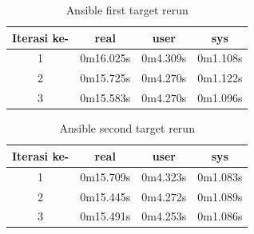 \documentclass[10pt,]{report}
\begin{document}
\begin{adjustwidth}{20pt}{}
	\begin{table}[H]
		\caption{Ansible first target rerun}
		\begin{center}
			\begin{tabular}[c]{|c|c|c|c|}
				\hline
				\multicolumn{1}{|c|}{\textbf{Iterasi ke-}} &
				\multicolumn{1}{c|}{\textbf{real}}         &
				\multicolumn{1}{c|}{\textbf{user}}         &
				\multicolumn{1}{c|}{\textbf{sys}}                                            \\
				\hline
				1                                          & 0m16.025s & 0m4.309s & 0m1.108s \\
				\hline
				2                                          & 0m15.725s & 0m4.270s & 0m1.122s \\
				\hline
				3                                          & 0m15.583s & 0m4.270s & 0m1.096s \\
				\hline
			\end{tabular}
		\end{center}
	\end{table}
	\vspace{-5mm}
	\begin{table}[H]
		\caption{Ansible second target rerun}
		\begin{center}
			\begin{tabular}[c]{|c|c|c|c|}
				\hline
				\multicolumn{1}{|c|}{\textbf{Iterasi ke-}} &
				\multicolumn{1}{c|}{\textbf{real}}         &
				\multicolumn{1}{c|}{\textbf{user}}         &
				\multicolumn{1}{c|}{\textbf{sys}}                                            \\
				\hline
				1                                          & 0m15.709s & 0m4.323s & 0m1.083s \\
				\hline
				2                                          & 0m15.445s & 0m4.272s & 0m1.089s \\
				\hline
				3                                          & 0m15.491s & 0m4.253s & 0m1.086s \\
				\hline
			\end{tabular}
		\end{center}
	\end{table}

\end{adjustwidth}
\end{document}
